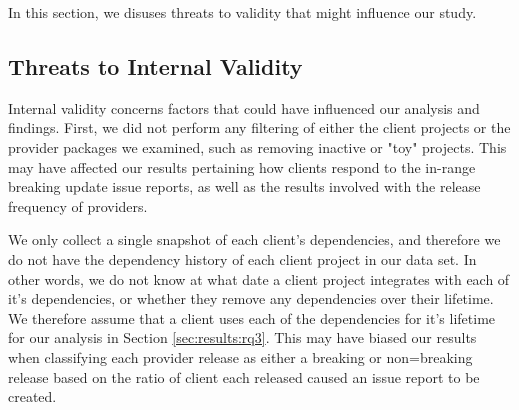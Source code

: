 In this section, we disuses threats to validity that might influence our study.
\subsection{Threats to Internal Validity}
Internal validity concerns factors that could have influenced our analysis and findings. First, we did not perform any filtering of either the client projects or the provider packages we examined, such as removing inactive or "toy" projects. This may have affected our results pertaining how clients respond to the in-range breaking update issue reports, as well as the results involved with the release frequency of providers.
\par
We only collect a single snapshot of each client's dependencies, and therefore we do not have the dependency history of each client project in our data set. In other words, we do not know at what date a client project integrates with each of it's dependencies, or whether they remove any dependencies over their lifetime. We therefore assume that a client uses each of the dependencies for it's lifetime for our analysis in Section \ref{sec:results:rq3}. This may have biased our results when classifying each provider release as either a breaking or non=breaking release based on the ratio of client each released caused an issue report to be created.

